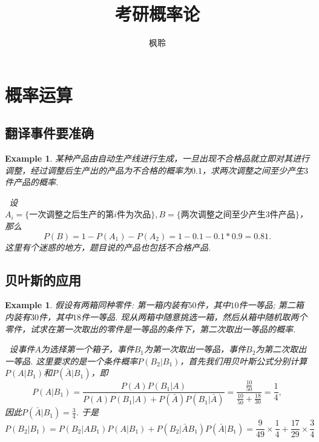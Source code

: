 \documentclass{article}
\newtheorem{example}[theorem]{Example}
\newcommand{\hints}{{\color{blue} \text{hints}}}
\begin{document}
\title{考研概率论}
\author{枫聆}
\maketitle

\tableofcontents

\newpage
\section{概率运算}

\subsection{翻译事件要准确}

\begin{example}
\rm 某种产品由自动生产线进行生成，一旦出现不合格品就立即对其进行调整，经过调整后生产出的产品为不合格的概率为$0.1$，求两次调整之间至少产生$3$件产品的概率. 

\hints\ 设$A_i = \{\text{一次调整之后生产的第$i$件为次品}\}, B=\{\text{两次调整之间至少产生$3$件产品}\}$，那么
$$
P(B) =  1- P(A_1) - P(A_2) = 1-0.1-0.1*0.9 = 0.81. 
$$
这里有个迷惑的地方，题目说的产品也包括不合格产品. 
\end{example}

\subsection{贝叶斯的应用}

\begin{example}
\rm 假设有两箱同种零件: 第一箱内装有$50$件，其中$10$件一等品; 第二箱内装有$30$件，其中$18$件一等品. 现从两箱中随意挑选一箱，然后从箱中随机取两个零件，试求在第一次取出的零件是一等品的条件下，第二次取出一等品的概率.

\hints\ 设事件$A$为选择第一个箱子，事件$B_1$为第一次取出一等品，事件$B_2$为第二次取出一等品. 这里要求的是一个条件概率$P(B_2|B_1)$，首先我们用贝叶斯公式分别计算$P(A|B_1)$和$P(\bar{A}|B_1)$，即
$$
P(A|B_1) = \frac{P(A)P(B_1|A)}{P(A)P(B_1|A) + P(\bar{A})P(B_1|\bar{A})} = \frac{\frac{10}{50}}{\frac{10}{50} + \frac{18}{30}} = \frac{1}{4},
$$ 
因此$P(\bar{A}|B_1) = \frac{3}{4}$. 于是
$$
P(B_2|B_1) = P(B_2|AB_1)P(A|B_1) + P(B_2|\bar{A}B_1)P(\bar{A}|B_1) = \frac{9}{49}\times\frac{1}{4} + \frac{17}{29} \times \frac{3}{4}
$$
\end{example}
\end{document}
